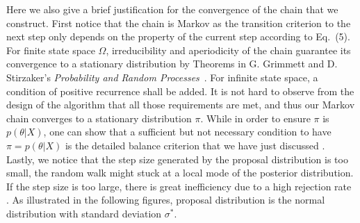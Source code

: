 \documentclass[11pt]{article}
\theoremstyle{break}
\theoremstyle{break}
\newcommand{\txt}{G. Grimmett and D. Stirzaker's \textit{Probability and Random Processes}}
\begin{document}
${}$\qquad Here we also give a brief justification for the convergence of the chain that we construct. First notice that the chain is Markov as the transition criterion to the next step only depends on the property of the current step according to Eq.\ (5). For finite state space $\Omega$, irreducibility and aperiodicity of the chain guarantee its convergence to a stationary distribution by Theorems in \txt\ \cite{txt}. For infinite state space, a condition of positive recurrence shall be added. It is not hard to observe from the design of the algorithm that all those requirements are met, and thus our Markov chain converges to a stationary distribution $\pi$. While in order to ensure $\pi$ is $p(\theta|X)$, one can show that a sufficient but not necessary condition to have $\pi = p(\theta|X)$ is the detailed balance criterion that we have just discussed \cite{ML}.\\

${}$\qquad Lastly, we notice that the step size generated by the proposal distribution is too small, the random walk might stuck at a local mode of the posterior distribution. If the step size is too large, there is great inefficiency due to a high rejection rate \cite{ML}. As illustrated in the following figures, proposal distribution is the normal distribution with standard deviation $\sigma^*$.
\end{document}
